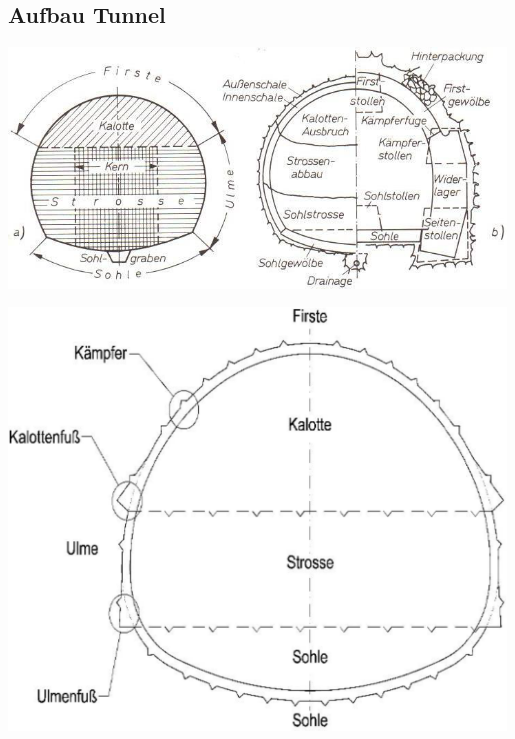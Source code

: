 \documentclass[fleqn,twoside]{article}
\begin{document}
\subsection{Aufbau Tunnel}
\begin{minipage}{0.6\textwidth}
    \includegraphics[width=0.99\textwidth]{Grafiken/Tunnel_Aufbau_1.png}
\end{minipage}
\begin{minipage}{0.3\textwidth}
    \includegraphics[width=0.99\textwidth]{Grafiken/Tunnel_Aufbau_2.png}
\end{minipage}
\end{document}

